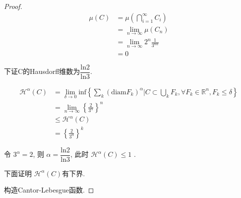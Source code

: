 \documentclass[hyperref,a4paper,UTF8]{ctexart}
\begin{document}
\begin{proof}
\[
\begin{aligned}
  \mu(C) &= \mu\left(\bigcap_{i=1}^{\infty} C_i\right) \\
  &= \lim\limits_{n \rightarrow \infty} \mu(C_n) \\
  &=  \lim\limits_{n \rightarrow \infty}2^{n}\frac{1}{3^{n\alpha}}\\
  &= 0
\end{aligned}
\]

下证C的Hausdorff维数为$\dfrac{\mathrm{ln}2}{\mathrm{ln}3}$.

\[
\begin{aligned}
  \mathcal{H}^\alpha(C) &= \lim\limits_{\delta \rightarrow 0}\mathrm{inf}\left \{ \sum_{k}(\mathrm{diam}F_k)^{\alpha} \vert C \subset \bigcup\limits_{k} F_k , \forall F_k\in \mathbb{R}^n, F_k \le \delta \right \} \\
  &= \lim\limits_{n \rightarrow \infty}\left \{\frac{2}{3^\alpha} \right \}^{n} \\
  &\leqslant \mathcal{H}^\alpha(C)\\
  &= \left \{\frac{2}{3^\alpha} \right \}^{k}
\end{aligned}  
\]

令 $3^\alpha = 2$, 则
$\alpha = \dfrac{\mathrm{ln}2}{\mathrm{ln}3}$, 此时 $\mathcal{H}^\alpha(C) \leqslant 1 $ . 

下面证明 $\mathcal{H}^\alpha(C)$有下界.

构造Cantor-Lebesgue函数. 


\end{proof}
\end{document}
